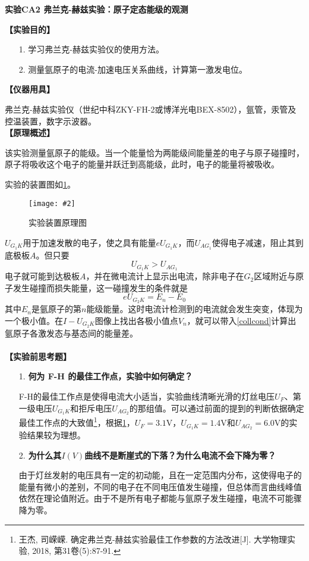\documentclass[11pt,a4paper]{ctexart}
\newcommand{\ExpeName}{实验CA2 弗兰克-赫兹实验：原子定态能级的观测}
\newcommand{\cpic}[2]{
\begin{center}
\texttt{[image: \#2]}
\end{center}
}
\newcommand{\cpicn}[3]
{
\begin{figure}[h!]
\cpic{#1}{#2}
\caption{#3\label{#2}}
\end{figure}
}
\newcommand{\beq}{\begin{equation}}
\newcommand{\eeq}{\end{equation}}
\newcommand{\volt}{\mathrm{V}}
\begin{document}
\newpage%
\begin{center}
\LARGE{\textbf{\ExpeName}}
\end{center}
\textbf{【实验目的】}
\begin{enumerate}
 \item[1.]学习弗兰克-赫兹实验仪的使用方法。
 \item[2.]测量氩原子的电流-加速电压关系曲线，计算第一激发电位。
\end{enumerate}
\textbf{【仪器用具】}\par
弗兰克-赫兹实验仪（世纪中科ZKY-FH-2或博洋光电BEX-8502），氩管，汞管及控温装置，数字示波器。  \\ 
\textbf{【原理概述】}\par
该实验测量氩原子的能级。当一个能量恰为两能级间能量差的电子与原子碰撞时，原子将吸收这个电子的能量并跃迁到高能级，此时，电子的能量将被吸收。
\par
实验的装置图如\cref{princ1}。
\cpicn{0.5}{princ1}{实验装置原理图}
$U_{G_1 K}$用于加速发散的电子，使之具有能量$eU_{G_1 K}$，而$U_{AG_1}$使得电子减速，阻止其到底极板$A$。但只要
\beq
U_{G_1 K} > U_{AG_1}
\eeq
电子就可能到达极板$A$，并在微电流计上显示出电流，除非电子在$G_2$区域附近与原子发生碰撞而损失能量，这一碰撞发生的条件就是
\beq \label{collcond}
eU_{G_2 K} = E_n - E_0
\eeq
其中$E_n$是氩原子的第$n$能级能量。这时电流计检测到的电流就会发生突变，体现为一个极小值。在$I - U_{G_2 K}$图像上找出各极小值点$V_n$，就可以带入\cref{collcond}计算出氩原子各激发态与基态间的能量差。
\\
\ 
\\
\textbf{【实验前思考题】}
\begin{enumerate}
 \item[1.]\textbf{何为 F-H 的最佳工作点，实验中如何确定？}\par
F-H的最佳工作点是使得电流大小适当，实验曲线清晰光滑的灯丝电压$U_F$、第一级电压$U_{G_1 K}$和拒斥电压$U_{AG_2}$的那组值。可以通过前面的提到的判断依据确定最佳工作点的大致值\footnote{王杰, 司嵘嵘. 确定弗兰克-赫兹实验最佳工作参数的方法改进[J]. 大学物理实验, 2018, 第31卷(5):87-91.\label{bestpt}}，根据\cref{bestpt}，$U_F= 3.1\volt$，$U_{G_1 K} = 1.4\volt$和$U_{AG_2} = 6.0\volt$的实验结果较为理想。
 \item[2.]\textbf{为什么其$I(V)$曲线不是断崖式的下落？为什么电流不会下降为零？}\par
由于灯丝发射的电压具有一定的初动能，且在一定范围内分布，这使得电子的能量有微小的差别，不同的电子在不同电压值发生碰撞，但总体而言曲线峰值依然在理论值附近。由于不是所有电子都能与氩原子发生碰撞，电流不可能骤降为零。
\end{enumerate}
\end{document}
